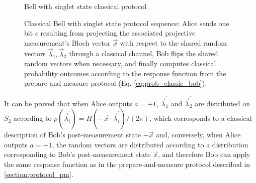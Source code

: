 \begin{figure}[tb]
\begin{center}
\begin{msc}[msc keyword=, instance width=4.6cm]{Bell with singlet state classical protocol}
\nextlevel[3]
\nextlevel[3]
\nextlevel[1]
\nextlevel[3]
\nextlevel[2]
\end{msc}
\end{center}
\caption{Classical Bell with singlet state protocol sequence: Alice sends one bit $c$ resulting from projecting the associated projective measurement's Bloch vector $\vec{x}$ with respect to the shared random vectors $\vec{\lambda}_1, \vec{\lambda}_2$ through a classical channel, Bob flips the shared random vectors when necessary, and finally computes classical probability outcomes according to the response function from the prepare-and measure protocol (Eq. \ref{eq:prob_classic_bob}).}
\label{fig:msc_bell}
\end{figure}

It can be proved that when Alice outputs $a=+1$, $\vec{\lambda}^{\prime}_1$ and $\vec{\lambda}^{\prime}_2$ are distributed on $S_2$ according to $\rho(\vec{\lambda}^{\prime}_i) = H(-\vec{x} \cdot \vec{\lambda}^{\prime}_i)/(2\pi)$, which corresponds to a classical description of Bob's post-measurement state $-\vec{x}$ and, conversely, when Alice outputs $a=-1$, the random vectors are distributed according to a distribution corresponding to Bob's post-measurement state $\vec{x}$, and therefore Bob can apply the same response function as in the prepare-and-measure protocol described in \ref{section:protocol_pm}. 